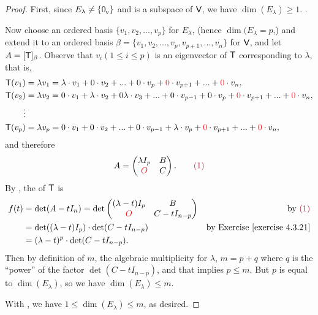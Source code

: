 \begin{proof}
First, since \(E_{\lambda} \ne \{ 0_{_{\textsf{V}}} \}\) and is a subspace of \(\textsf{V}\), we have \(\dim(E_{\lambda}) \ge 1\). .

\sloppy Now choose an ordered basis \(\{ v_1, v_2, ..., v_p \}\) for \(E_{\lambda}\), (hence \(\dim(E_{\lambda} = p\),)
and extend it to an ordered basis \(\beta = \{ v_1, v_2, ..., v_p, v_{p + 1}, ..., v_n \}\) for \(\textsf{V}\), and let \(A = [\textsf{T}]_{\beta}\).
Observe that \(v_i (1 \le i \le p)\) is an eigenvector of \(\textsf{T}\) corresponding to \(\lambda\),
that is,
\begin{align*}
    \T(v_1) & = \lambda v_1 = \lambda \cdot v_1 + 0 \cdot v_2 + ... + 0 \cdot v_p + \RED{0} \cdot v_{p + 1} + ... + \RED{0} \cdot v_n, \\
    \T(v_2) & = \lambda v_2 = 0 \cdot v_1 + \lambda \cdot v_2 + 0 \lambda \cdot v_3 + ... + 0 \cdot v_{p - 1} + 0 \cdot v_p + \RED{0} \cdot v_{p + 1} + ... + \RED{0} \cdot v_n, \\
    \vdots & \\
    \T(v_p) & = \lambda v_p = 0 \cdot v_1 + 0 \cdot v_2 + ... + 0 \cdot v_{p - 1} + \lambda \cdot v_p + \RED{0} \cdot v_{p + 1} + ... + \RED{0} \cdot v_n,
\end{align*}
and therefore
\[
    A = \begin{pmatrix} \lambda I_p & B \\ \RED{O} & C \end{pmatrix}. \quad \quad \MAROON{(1)}
\]
By , the \CPOLY{} of \(\textsf{T}\) is
\begin{align*}
    f(t) & = \det(A - tI_n) = \det \begin{pmatrix} (\lambda - t) I_p & B \\ \RED{O} & C - tI_{n - p} \end{pmatrix} & \text{by \MAROON{(1)}} \\
         & = \det((\lambda - t) I_p) \cdot \det(C - tI_{n - p}) & \text{by \EXEC{4.3.21}} \\
         & = (\lambda - t)^p \cdot \det(C - tI_{n - p}).
\end{align*}
Then by definition of \(m\), the algebraic multiplicity for \(\lambda\), \(m = p + q\) where \(q\) is the ``power'' of the factor \(\det(C - tI_{n - p})\), and that implies \(p \le m\).
But \(p\) is equal to \(\dim(E_{\lambda})\), so we have \(\dim(E_{\lambda}) \le m\).

With , we have \(1 \le \dim(E_{\lambda}) \le m\), as desired.
\end{proof}

